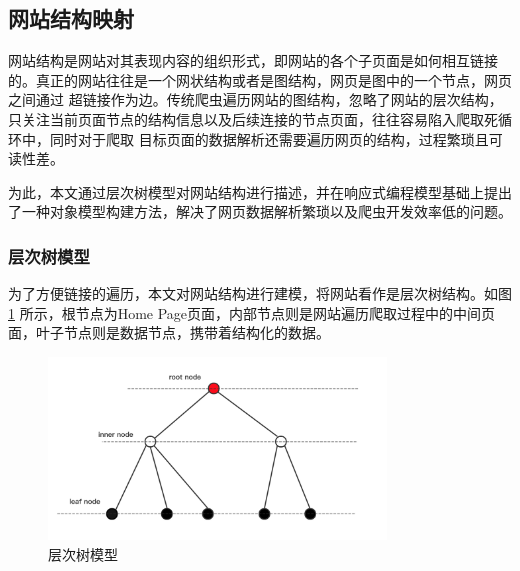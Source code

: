 \documentclass[master]{njuthesis}
\begin{document}


\subsection{网站结构映射}
网站结构是网站对其表现内容的组织形式，即网站的各个子页面是如何相互链接的。真正的网站往往是一个网状结构或者是图结构，网页是图中的一个节点，网页之间通过
超链接作为边。传统爬虫遍历网站的图结构，忽略了网站的层次结构，只关注当前页面节点的结构信息以及后续连接的节点页面，往往容易陷入爬取死循环中，同时对于爬取
目标页面的数据解析还需要遍历网页的结构，过程繁琐且可读性差。

为此，本文通过层次树模型对网站结构进行描述，并在响应式编程模型基础上提出了一种对象模型构建方法，解决了网页数据解析繁琐以及爬虫开发效率低的问题。

\subsubsection{层次树模型}
为了方便链接的遍历，本文对网站结构进行建模，将网站看作是层次树结构\cite{kleinberg1999web}。如图\ref{fig:Htree} 所示，根节点为Home Page页面，内部节点则是网站遍历爬取过程中的中间页面，叶子节点则是数据节点，携带着结构化的数据。

\begin{figure}
\centering
\includegraphics[width=0.8\textwidth]{pic/Htree.png}
\caption{层次树模型} \label{fig:Htree}
\end{figure}
\end{document}
